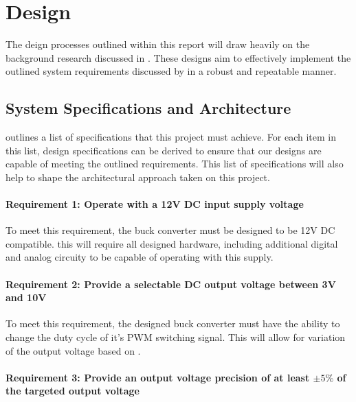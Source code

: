 \chapter{Design}\label{C:design}

The deign processes outlined within this report will draw heavily on the background research discussed in . These designs aim to effectively implement the outlined system requirements discussed by  in a robust and repeatable manner.


%
%

\section{System Specifications and Architecture}\label{S:specs_design}

 outlines a list of specifications that this project must achieve. For each item in this list, design specifications can be derived to ensure that our designs are capable of meeting the outlined requirements. This list of specifications will also help to shape the architectural approach taken on this project.


\subsubsection*{Requirement 1: Operate with a 12V DC input supply voltage}

To meet this requirement, the buck converter must be designed to be 12V DC compatible. this will require all designed hardware, including additional digital and analog circuity to be capable of operating with this supply.

\subsubsection*{Requirement 2: Provide a selectable DC output voltage between 3V and 10V}

To meet this requirement, the designed buck converter must have the ability to change the duty cycle of it's PWM switching signal. This will allow for variation of the output voltage based on .

\subsubsection*{Requirement 3: Provide an output voltage precision of at least $\pm5\%$ of the targeted output voltage}

